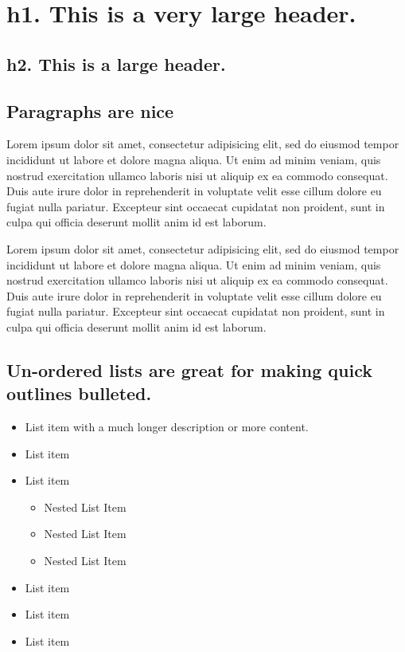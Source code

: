 \documentclass{juwit}
\begin{document}
  \section*{ h1. This is a very large header. }

  \subsection*{ h2. This is a large header. }

  \subsection*{ Paragraphs are nice }

  \par\addvspace{\medskipamount}\noindent             Lorem ipsum dolor sit amet, consectetur adipisicing elit, sed do eiusmod            tempor incididunt ut labore et dolore magna aliqua. Ut enim ad minim veniam,            quis nostrud exercitation ullamco laboris nisi ut aliquip ex ea commodo            consequat. Duis aute irure dolor in reprehenderit in voluptate velit esse            cillum dolore eu fugiat nulla pariatur. Excepteur sint occaecat cupidatat non            proident, sunt in culpa qui officia deserunt mollit anim id est laborum.

  \par\addvspace{\medskipamount}\noindent Lorem ipsum dolor sit amet, consectetur adipisicing elit, sed do eiusmod          tempor incididunt ut labore et dolore magna aliqua. Ut enim ad minim veniam,          quis nostrud exercitation ullamco laboris nisi ut aliquip ex ea commodo          consequat. Duis aute irure dolor in reprehenderit in voluptate velit esse          cillum dolore eu fugiat nulla pariatur. Excepteur sint occaecat cupidatat non          proident, sunt in culpa qui officia deserunt mollit anim id est laborum.

  \subsection*{ Un-ordered lists are great for making quick outlines bulleted. }

  \begin{itemize}                \item List item with a much longer description or more content.             \item List item             \item List item              \begin{itemize}                    \item Nested List Item                 \item Nested List Item                 \item Nested List Item              \end{itemize}                         \item List item             \item List item             \item List item          \end{itemize}
\end{document}
